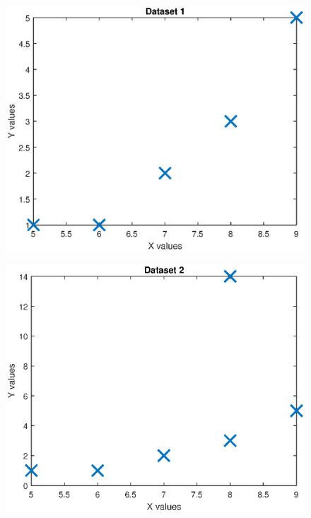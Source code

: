 \documentclass{article}
\begin{document}
\begin{figure}[h!]
\centering
\begin{minipage}{0.5\textwidth}
	\centering
	\includegraphics[scale = 0.40]{Part1_Dataplot.eps}
		\label{fig:Data1}
\end{minipage}%
\begin{minipage}{0.5\textwidth}
	\centering
	\includegraphics[scale = 0.40]{Part2_Dataplot.eps}
	\label{fig:Data2}
\end{minipage}
\end{figure}
\end{document}
